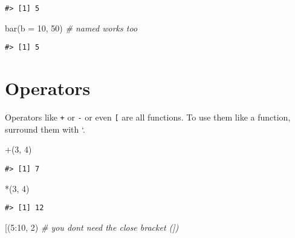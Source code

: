\documentclass[
]{book}
\newenvironment{Shaded}{\begin{snugshade}}{\end{snugshade}}
\newcommand{\AttributeTok}[1]{\textcolor[rgb]{0.77,0.63,0.00}{#1}}
\newcommand{\CommentTok}[1]{\textcolor[rgb]{0.56,0.35,0.01}{\textit{#1}}}
\newcommand{\DecValTok}[1]{\textcolor[rgb]{0.00,0.00,0.81}{#1}}
\newcommand{\FunctionTok}[1]{\textcolor[rgb]{0.00,0.00,0.00}{#1}}
\newcommand{\NormalTok}[1]{#1}
\newcommand{\SpecialCharTok}[1]{\textcolor[rgb]{0.00,0.00,0.00}{#1}}
\newcommand{\StringTok}[1]{\textcolor[rgb]{0.31,0.60,0.02}{#1}}
\begin{document}
\begin{verbatim}
#> [1] 5
\end{verbatim}

\begin{Shaded}
\begin{Highlighting}[]
\FunctionTok{bar}\NormalTok{(}\AttributeTok{b =} \DecValTok{10}\NormalTok{, }\DecValTok{50}\NormalTok{) }\CommentTok{\# named works too}
\end{Highlighting}
\end{Shaded}

\begin{verbatim}
#> [1] 5
\end{verbatim}

\hypertarget{operators}{%
\section{Operators}\label{operators}}

Operators like \texttt{+} or \texttt{-} or even \texttt{{[}} are all functions. To use them like a function, surround them with `.

\begin{Shaded}
\begin{Highlighting}[]
\StringTok{\textasciigrave{}}\AttributeTok{+}\StringTok{\textasciigrave{}}\NormalTok{(}\DecValTok{3}\NormalTok{, }\DecValTok{4}\NormalTok{)}
\end{Highlighting}
\end{Shaded}

\begin{verbatim}
#> [1] 7
\end{verbatim}

\begin{Shaded}
\begin{Highlighting}[]
\StringTok{\textasciigrave{}}\AttributeTok{*}\StringTok{\textasciigrave{}}\NormalTok{(}\DecValTok{3}\NormalTok{, }\DecValTok{4}\NormalTok{)}
\end{Highlighting}
\end{Shaded}

\begin{verbatim}
#> [1] 12
\end{verbatim}

\begin{Shaded}
\begin{Highlighting}[]
\StringTok{\textasciigrave{}}\AttributeTok{[}\StringTok{\textasciigrave{}}\NormalTok{(}\DecValTok{5}\SpecialCharTok{:}\DecValTok{10}\NormalTok{, }\DecValTok{2}\NormalTok{) }\CommentTok{\# you don\textquotesingle{}t need the close bracket (])}
\end{Highlighting}
\end{Shaded}
\end{document}
